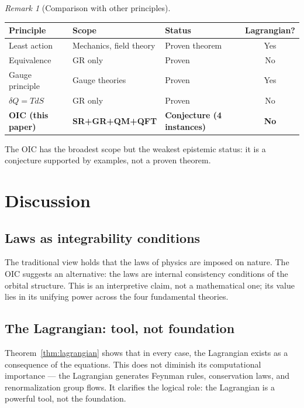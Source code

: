 \documentclass[12pt]{article}
\theoremstyle{plain}
\theoremstyle{definition}
\theoremstyle{remark}
\newtheorem{remark}[theorem]{Remark}
\begin{document}
\begin{remark}[Comparison with other principles]
\begin{center}\small
\begin{tabular}{lllc}\toprule
\textbf{Principle} & \textbf{Scope} & \textbf{Status} & \textbf{Lagrangian?} \\\midrule
Least action & Mechanics, field theory & Proven theorem & Yes \\
Equivalence & GR only & Proven & No \\
Gauge principle & Gauge theories & Proven & Yes \\
$\delta Q = TdS$ & GR only & Proven & No \\
\textbf{OIC (this paper)} & \textbf{SR+GR+QM+QFT} & \textbf{Conjecture (4 instances)} & \textbf{No} \\
\bottomrule
\end{tabular}
\end{center}
The OIC has the broadest scope but the weakest epistemic status: it is a conjecture supported by examples, not a proven theorem.
\end{remark}


\section{Discussion}
\label{sec:discussion}

\subsection{Laws as integrability conditions}

The traditional view holds that the laws of physics are imposed on nature. The OIC suggests an alternative: the laws are internal consistency conditions of the orbital structure. This is an interpretive claim, not a mathematical one; its value lies in its unifying power across the four fundamental theories.

\subsection{The Lagrangian: tool, not foundation}

Theorem~\ref{thm:lagrangian} shows that in every case, the Lagrangian exists as a consequence of the equations. This does not diminish its computational importance --- the Lagrangian generates Feynman rules, conservation laws, and renormalization group flows. It clarifies the logical role: the Lagrangian is a powerful tool, not the foundation.
\end{document}
